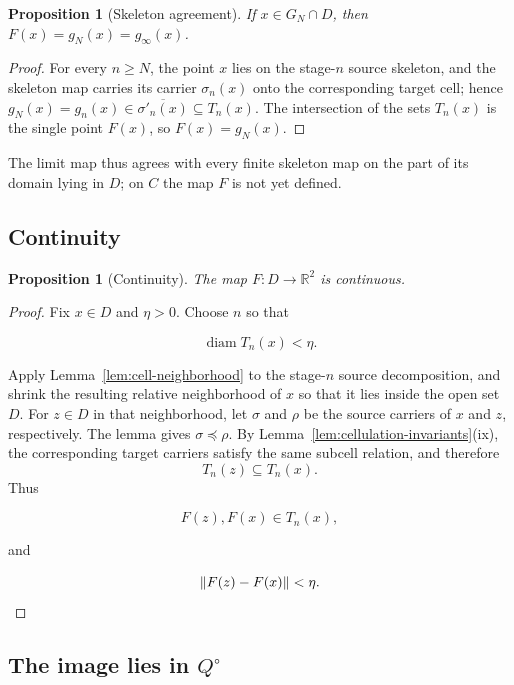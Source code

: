 \documentclass[11pt]{article}
\theoremstyle{mainplain}
\newtheorem{proposition}[theorem]{Proposition}
\theoremstyle{mainroman}
\theoremstyle{definition}
\numberwithin{equation}{section}
\begin{document}
\begin{proposition}[Skeleton agreement]\label{prop:skeleton-agreement}
If \(x\in G_N\cap D\), then \(F(x)=g_N(x)=g_\infty(x)\).
\end{proposition}
\begin{proof}
For every \(n\ge N\), the point \(x\) lies on the stage-\(n\) source
skeleton, and the skeleton map carries its carrier \(\sigma_n(x)\)
onto the corresponding target cell; hence
\(g_N(x)=g_n(x)\in\overline{\sigma'_n(x)}\subseteq T_n(x)\). The
intersection of the sets \(T_n(x)\) is the single point \(F(x)\), so
\(F(x)=g_N(x)\).
\end{proof}

The limit map thus agrees with every finite skeleton map on the part
of its domain lying in \(D\); on \(C\) the map \(F\) is not yet
defined.

\subsection{Continuity}\label{continuity}

\begin{proposition}[Continuity]\label{prop:F-continuous}
The map \(F:D\to\mathbb R^2\) is continuous.
\end{proposition}
\begin{proof}
Fix \(x\in D\) and \(\eta>0\). Choose \(n\) so that

\[
\operatorname{diam}T_n(x)<\eta.
\]

Apply Lemma~\ref{lem:cell-neighborhood} to the stage-\(n\) source decomposition, and shrink the resulting relative neighborhood of \(x\) so that it lies inside the open set \(D\). For \(z\in D\) in that neighborhood, let \(\sigma\) and \(\rho\) be the source carriers of \(x\) and \(z\), respectively. The lemma gives \(\sigma\preceq\rho\). By Lemma~\ref{lem:cellulation-invariants}\textup{(ix)}, the corresponding target carriers satisfy the same subcell relation, and therefore
\[
 T_n(z)\subseteq T_n(x).
\]
Thus

\[
F(z),F(x)\in T_n(x),
\]

and

\[
\|F(z)-F(x)\|<\eta. \qedhere
\]
\end{proof}

\subsection{\texorpdfstring{The image lies in \(Q^\circ\)}{The image lies in the interior of Q}}\label{the-image-lies-in-qcirc}
\end{document}
